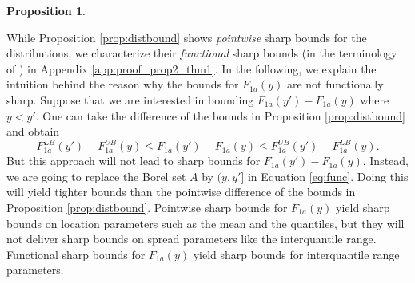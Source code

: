 \documentclass[12pt]{article}
\theoremstyle{plain}
\newtheorem{proposition}{Proposition}%
\theoremstyle{definition}
\theoremstyle{remark}
\begin{document}
\begin{proposition}
\end{proposition}
While Proposition \ref{prop:distbound} shows \textit{pointwise} sharp bounds for the distributions, we characterize their \textit{functional} sharp bounds (in the terminology of \cite{mourifie2020sharp}) in Appendix \ref{app:proof_prop2_thm1}. 
In the following, we explain the intuition behind the reason why the bounds for $F_{1a}(y)$ are not functionally sharp. Suppose that we are interested in bounding $F_{1a}(y')-F_{1a}(y)$ where $y < y'$. One can take the difference of the bounds in Proposition \ref{prop:distbound} and obtain
$$F_{1a}^{LB}(y')-F_{1a}^{UB}(y) \leq F_{1a}(y')-F_{1a}(y) \leq F_{1a}^{UB}(y')-F_{1a}^{LB}(y).$$
But this approach will not lead to sharp bounds for $F_{1a}(y')-F_{1a}(y)$. Instead, we are going to replace the Borel set $A$ by $(y,y']$ in Equation \eqref{eq:func}. Doing this will yield tighter bounds than the pointwise difference of the bounds in Proposition \ref{prop:distbound}. Pointwise sharp bounds for $F_{1a}(y)$ yield sharp bounds on location parameters such as the mean and the quantiles, but they will not deliver sharp bounds on spread parameters like the interquantile range. Functional sharp bounds for $F_{1a}(y)$ yield sharp bounds for interquantile range parameters.  
\end{document}
